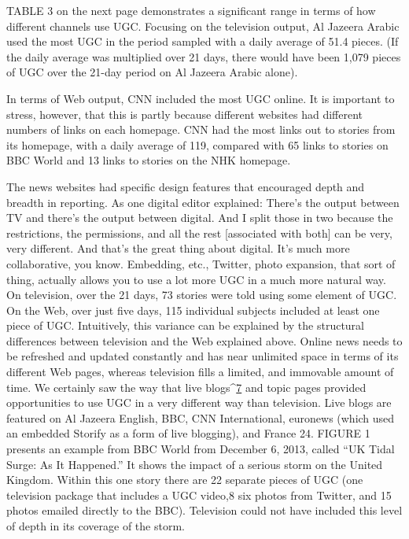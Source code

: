\begin{enumerate}
TABLE 3 on the next page demonstrates a significant range in terms of
how different channels use UGC. Focusing on the television output, Al
Jazeera Arabic used the most UGC in the period sampled with a daily average
of 51.4 pieces. (If the daily average was multiplied over 21 days, there
would have been 1,079 pieces of UGC over the 21-day period on Al Jazeera
Arabic alone).

In terms of Web output, CNN included the most UGC online. It is important
to stress, however, that this is partly because different websites had different
numbers of links on each homepage. CNN had the most links out to stories
from its homepage, with a daily average of 119, compared with 65 links to
stories on BBC World and 13 links to stories on the NHK homepage.

The news websites had specific design features that encouraged depth and
breadth in reporting. As one digital editor explained:
There's the output between TV and there's the output between
digital. And I split those in two because the restrictions, the permissions,
and all the rest [associated with both] can be very, very
different. And that's the great thing about digital. It's much more
collaborative, you know. Embedding, etc., Twitter, photo expansion,
that sort of thing, actually allows you to use a lot more UGC in a
much more natural way.
On television, over the 21 days, 73 stories were told using some element
of UGC. On the Web, over just five days, 115 individual subjects included
at least one piece of UGC. Intuitively, this variance can be explained by
the structural differences between television and the Web explained above.
Online news needs to be refreshed and updated constantly and has near
unlimited space in terms of its different Web pages, whereas television fills
a limited, and immovable amount of time.
We certainly saw the way that live blogs^{\href{#endnotes}{7}} and topic pages provided opportunities
to use UGC in a very different way than television. Live blogs are
featured on Al Jazeera English, BBC, CNN International, euronews (which
used an embedded Storify as a form of live blogging), and France 24. FIGURE
1 presents an example from BBC World from December 6, 2013, called
``UK Tidal Surge: As It Happened.'' It shows the impact of a serious storm on
the United Kingdom. Within this one story there are 22 separate pieces of
UGC (one television package that includes a UGC video,8 six photos from
Twitter, and 15 photos emailed directly to the BBC). Television could not
have included this level of depth in its coverage of the storm.


\end{enumerate}

